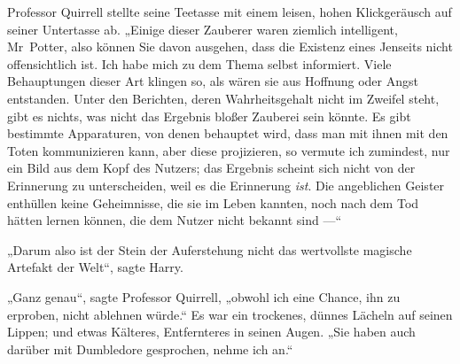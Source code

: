 Professor Quirrell stellte seine Teetasse mit einem leisen, hohen Klickgeräusch auf seiner Untertasse ab.
„Einige dieser Zauberer waren ziemlich intelligent, Mr~Potter, also können Sie davon ausgehen, dass die Existenz eines Jenseits nicht offensichtlich ist. Ich habe mich zu dem Thema selbst informiert. Viele Behauptungen dieser Art klingen so, als wären sie aus Hoffnung oder Angst entstanden. Unter den Berichten, deren Wahrheitsgehalt nicht im Zweifel steht, gibt es nichts, was nicht das Ergebnis bloßer Zauberei sein könnte. Es gibt bestimmte Apparaturen, von denen behauptet wird, dass man mit ihnen mit den Toten kommunizieren kann, aber diese projizieren, so vermute ich zumindest, nur ein Bild aus dem Kopf des Nutzers; das Ergebnis scheint sich nicht von der Erinnerung zu unterscheiden, weil es die Erinnerung \emph{ist}. Die angeblichen Geister enthüllen keine Geheimnisse, die sie im Leben kannten, noch nach dem Tod hätten lernen können, die dem Nutzer nicht bekannt sind —“

„Darum also ist der Stein der Auferstehung nicht das wertvollste magische Artefakt der Welt“, sagte Harry.

„Ganz genau“, sagte Professor Quirrell, „obwohl ich eine Chance, ihn zu erproben, nicht ablehnen würde.“ Es war ein trockenes, dünnes Lächeln auf seinen Lippen; und etwas Kälteres, Entfernteres in seinen Augen.
„Sie haben auch darüber mit Dumbledore gesprochen, nehme ich an.“

